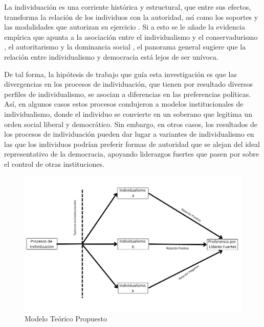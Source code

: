 \documentclass[12pt,oneside]{templates/facsothesis}
\begin{document}
La individuación es una corriente histórica y estructural, que entre sus efectos, transforma la relación de los individuos con la autoridad, así como los soportes y las modalidades que autorizan su ejercicio \citep{araujo2021}. Si a esto se le añade la evidencia empírica que apunta a la asociación entre el individualismo y el conservadurismo \citep{zhang2009}, el autoritarismo \citep{kemmelmeier2003} y la dominancia social \citep{strunk1999}, el panorama general sugiere que la relación entre individualismo y democracia está lejos de ser unívoca.

De tal forma, la hipótesis de trabajo que guía esta investigación es que las divergencias en los procesos de individuación, que tienen por resultado diversos perfiles de individualismo, se asocian a diferencias en las preferencias políticas. Así, en algunos casos estos procesos condujeron a modelos institucionales de individualismo, donde el individuo se convierte en un soberano que legitima un orden social liberal y democrático. Sin embargo, en otros casos, los resultados de los procesos de individuación pueden dar lugar a variantes de individualismo en las que los individuos podrían preferir formas de autoridad que se alejan del ideal representativo de la democracia, apoyando liderazgos fuertes que pasen por sobre el control de otras instituciones.

\begin{figure}[H]

{\centering \includegraphics[width=1\linewidth,]{images/hipotesis} 

}

\caption{Modelo Teórico Propuesto}\label{fig:unnamed-chunk-3}
\end{figure}
\FloatBarrier
\end{document}

